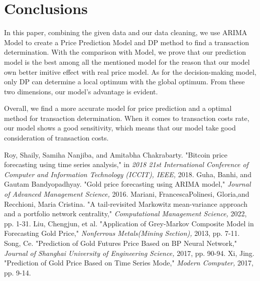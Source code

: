 \documentclass{mcmthesis}
\begin{document}
\section{Conclusions}
\par In this paper, combining the given data and our data cleaning, we use ARIMA Model to create a Price Prediction Model and DP method to find a transaction determination. With the comparison with Model, we prove that our prediction model is the best among all the mentioned model for the reason that our model own better imitive effect with real price model. As for the decision-making model, only DP can determine a local optimum with the global optimum. From these two dimensions, our model's advantage is evident.
\par Overall, we find a more accurate model for price prediction and a optimal method for transaction determination. When it comes to transaction costs rate, our model shows a good sensitivity, which means that our model take good consideration of transaction costs.

\begin{thebibliography}{99}
Roy, Shaily, Samiha Nanjiba, and Amitabha Chakrabarty. "Bitcoin price forecasting using time series analysis," in \emph{2018 21st International Conference of Computer and Information Technology (ICCIT), IEEE,} 2018.
Guha, Banhi, and Gautam Bandyopadhyay. "Gold price forecasting using ARIMA model," \emph{Journal of Advanced Management Science,} 2016.
Mariani, FrancescaPolinesi, Gloria,and Recchioni, Maria Cristina. "A tail-revisited Markowitz mean-variance approach and a portfolio network centrality," \emph{Computational Management Science,} 2022, pp. 1-31.
Liu, Chengjun, et al. "Application of Grey-Markov Composite Model in Forecasting Gold Price," \emph{Nonferrous Metals(Mining Section),} 2013, pp. 7-11.
Song, Ce. "Prediction of Gold Futures Price Based on BP Neural Network," \emph{Journal of Shanghai University of Engineering Science,} 2017, pp. 90-94.
Xi, Jing. "Prediction of Gold Price Based on Time Series Mode," \emph{Modern Computer,} 2017, pp. 9-14.
\end{thebibliography}
\end{document}
